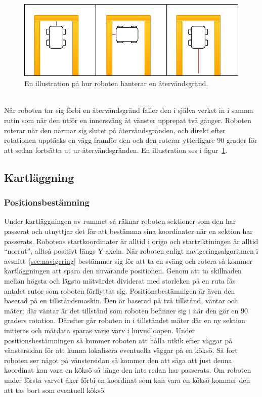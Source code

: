 \documentclass{article}
\begin{document}
\begin{figure}[H]
\centering
\includegraphics[scale=0.6]{navigation_dead_end}
\caption{En illustration på hur roboten hanterar en återvändsgränd.}
\label{fig:navigation_dead_end}
\end{figure}
\ \\
\newline
När roboten tar sig förbi en återvändsgränd faller den i själva verket in i samma rutin som när den utför en innersväng åt vänster upprepat två gånger. Roboten roterar när den närmar sig slutet på återvändsgränden, och direkt efter rotationen upptäcks en vägg framför den och den roterar ytterligare 90 grader för att sedan fortsätta ut ur återvändsgränden. En illustration ses i figur~\ref{fig:navigation_dead_end}.

\subsection{Kartläggning}
\subsubsection{Positionsbestämning}
\label{sec:position}
Under kartläggningen av rummet så räknar roboten sektioner som den har passerat och utnyttjar det för att bestämma sina koordinater när en sektion har passerats. Robotens startkoordinater är alltid i origo och startriktiningen är alltid ``norrut'', alltså positivt längs Y-axeln. När roboten enligt navigeringsalgoritmen i avsnitt~\ref{sec:navigering} bestämmer sig för att ta en sväng och rotera så kommer kartläggningen att spara den nuvarande positionen. Genom att ta skillnaden mellan högsta och lägsta mätvärdet dividerat med storleken på en ruta fås antalet rutor som roboten förflyttat sig. Positionsbestämnigen är även den baserad på en tillståndsmaskin. Den är baserad på två tillstånd, väntar och mäter; där väntar är det tillstånd som roboten befinner sig i när den gör en 90 graders rotation. Därefter går roboten in i tillståndet mäter där en ny sektion initieras och mätdata sparas varje varv i huvudloopen.\newline \newline
Under positionsbestämningen så kommer roboten att hålla utkik efter väggar på vänstersidan för att kunna lokalisera eventuella väggar på en köksö. Så fort roboten ser något på vänstersidan så kommer den att säga att just denna koordinat kan vara en köksö så länge den inte redan har passerats. Om roboten under första varvet åker förbi en koordinat som kan vara en köksö kommer den att tas bort som eventuell köksö.
\end{document}
